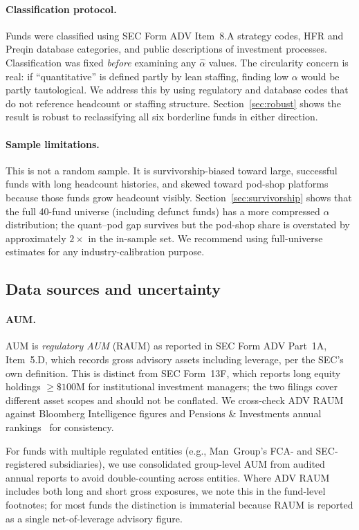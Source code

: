 \documentclass[12pt]{article}
\newcommand{\alphahat}{\hat{\alpha}}
\begin{document}
\paragraph{Classification protocol.}
Funds were classified using SEC Form ADV Item~8.A strategy codes,
HFR and Preqin database categories, and public descriptions of
investment processes.
Classification was fixed \emph{before} examining any $\alphahat$
values.
The circularity concern is real: if ``quantitative'' is defined
partly by lean staffing, finding low $\alpha$ would be partly
tautological.
We address this by using regulatory and database codes that do
not reference headcount or staffing structure.
Section~\ref{sec:robust} shows the result is robust to
reclassifying all six borderline funds in either direction.

\paragraph{Sample limitations.}
This is not a random sample.
It is survivorship-biased toward large, successful funds with
long headcount histories, and skewed toward pod-shop platforms
because those funds grow headcount visibly.
Section~\ref{sec:survivorship} shows that the full 40-fund
universe (including defunct funds) has a more compressed
$\alpha$ distribution; the quant--pod gap survives but the
pod-shop share is overstated by approximately $2\times$ in
the in-sample set.
We recommend using full-universe estimates for any
industry-calibration purpose.

\subsection{Data sources and uncertainty}
\label{sec:datasources}

\paragraph{AUM.}
AUM is \emph{regulatory AUM} (RAUM) as reported in SEC Form
ADV Part~1A, Item~5.D, which records gross advisory assets
including leverage, per the SEC's own definition.
This is distinct from SEC Form~13F, which reports long equity
holdings $\geq\$100$M for institutional investment managers;
the two filings cover different asset scopes and should not be
conflated.
We cross-check ADV RAUM against Bloomberg Intelligence figures
and Pensions \& Investments annual rankings~\cite{pandi2024}
for consistency.

For funds with multiple regulated entities (e.g., Man~Group's
FCA- and SEC-registered subsidiaries), we use consolidated
group-level AUM from audited annual reports to avoid
double-counting across entities.
Where ADV RAUM includes both long and short gross exposures,
we note this in the fund-level footnotes; for most funds the
distinction is immaterial because RAUM is reported as a single
net-of-leverage advisory figure.
\end{document}

